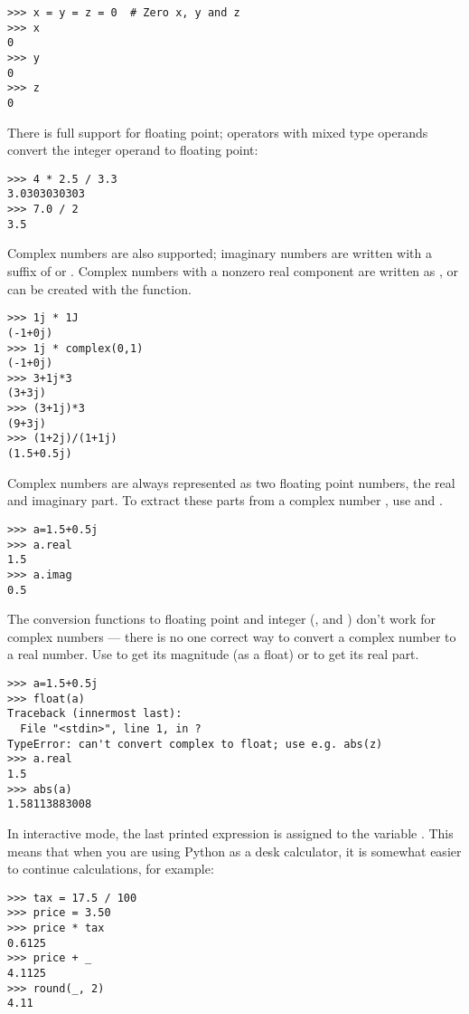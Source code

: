 \documentclass{manual}
\begin{document}
\begin{verbatim}
>>> x = y = z = 0  # Zero x, y and z
>>> x
0
>>> y
0
>>> z
0
\end{verbatim}
%
There is full support for floating point; operators with mixed type
operands convert the integer operand to floating point:

\begin{verbatim}
>>> 4 * 2.5 / 3.3
3.0303030303
>>> 7.0 / 2
3.5
\end{verbatim}
%
Complex numbers are also supported; imaginary numbers are written with
a suffix of  or .  Complex numbers with a nonzero
real component are written as , or can
be created with the  function.

\begin{verbatim}
>>> 1j * 1J
(-1+0j)
>>> 1j * complex(0,1)
(-1+0j)
>>> 3+1j*3
(3+3j)
>>> (3+1j)*3
(9+3j)
>>> (1+2j)/(1+1j)
(1.5+0.5j)
\end{verbatim}
%
Complex numbers are always represented as two floating point numbers,
the real and imaginary part.  To extract these parts from a complex
number , use  and .  

\begin{verbatim}
>>> a=1.5+0.5j
>>> a.real
1.5
>>> a.imag
0.5
\end{verbatim}
%
The conversion functions to floating point and integer
(,  and ) don't
work for complex numbers --- there is no one correct way to convert a
complex number to a real number.  Use  to get its
magnitude (as a float) or  to get its real part.

\begin{verbatim}
>>> a=1.5+0.5j
>>> float(a)
Traceback (innermost last):
  File "<stdin>", line 1, in ?
TypeError: can't convert complex to float; use e.g. abs(z)
>>> a.real
1.5
>>> abs(a)
1.58113883008
\end{verbatim}
%
In interactive mode, the last printed expression is assigned to the
variable \code{_}.  This means that when you are using Python as a
desk calculator, it is somewhat easier to continue calculations, for
example:

\begin{verbatim}
>>> tax = 17.5 / 100
>>> price = 3.50
>>> price * tax
0.6125
>>> price + _
4.1125
>>> round(_, 2)
4.11
\end{verbatim}
\end{document}
